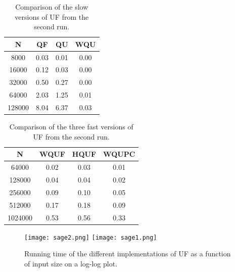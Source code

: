 \documentclass{article}
\begin{document}
\begin{table}[H]
	\begin{center}
		\begin{tabular}{c | c c c } %
			\toprule
			{\bf N} & {\bf QF} &  {\bf  QU} & {\bf WQU} \\ 
			\midrule
			8000 & 0.03 & 0.01 & 0.00 \\
			16000 & 0.12 & 0.03 & 0.00 \\
			32000 & 0.50 & 0.27 & 0.00 \\
			64000 & 2.03 & 1.25 & 0.01 \\
			128000 & 8.04 & 6.37 & 0.03 \\
			\bottomrule
		\end{tabular}
		\caption{Comparison of the slow versions of UF from the second run.}
		\label{tab:deami2}
	\end{center}
\end{table}

\begin{table}[H]
	\begin{center}
		\begin{tabular}{c | c c c} %
			\toprule
            {\bf N} & {\bf WQUF}  & {\bf  HQUF} &  {\bf WQUPC }  \\ 
			\midrule
            64000 & 0.02  & 0.03  & 0.01 \\
            128000 & 0.04  & 0.04  & 0.02 \\
            256000 & 0.09  & 0.10  & 0.05 \\
            512000 & 0.17  & 0.18  & 0.09 \\
            1024000 & 0.53  & 0.56  & 0.33 \\
			\bottomrule
		\end{tabular}
		\caption{Comparison of the three fast versions of UF from the second run.}
		\label{tab:deami3}
	\end{center}
\end{table}

\begin{figure}[h]
	\begin{center}
		\texttt{[image: sage2.png]} %
		\texttt{[image: sage1.png]} %
		\caption{Running time of the different implementations of UF as a function of input size on a log-log plot.}
	\end{center}
\end{figure}
\end{document}
